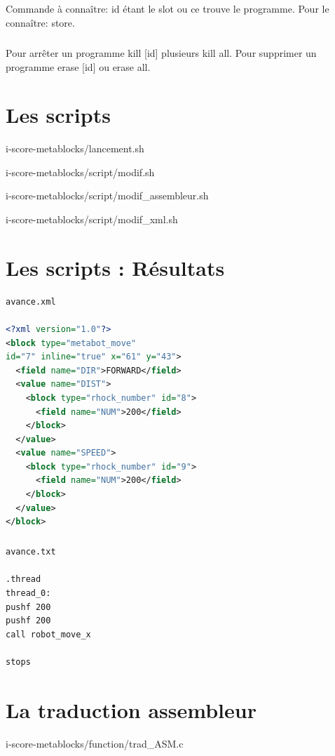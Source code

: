 \documentclass[10pt,a4paper]{report}
\begin{document}
\begin{appendices}
\paragraph{}
Commande à connaître:
id étant le slot ou ce trouve le programme. Pour le connaître: store.
\paragraph{}
Pour arrêter un programme kill [id] plusieurs kill all. Pour supprimer un programme erase [id] ou erase all.

\chapter{Les scripts} 

{i-score-metablocks/lancement.sh}


{i-score-metablocks/script/modif.sh}


{i-score-metablocks/script/modif_assembleur.sh}


{i-score-metablocks/script/modif_xml.sh}

\chapter{Les scripts : Résultats} 
\begin{lstlisting}[language=xml, frame=none]
avance.xml

<?xml version="1.0"?>
<block type="metabot_move" 
id="7" inline="true" x="61" y="43">
  <field name="DIR">FORWARD</field>
  <value name="DIST">
    <block type="rhock_number" id="8">
      <field name="NUM">200</field>
    </block>
  </value>
  <value name="SPEED">
    <block type="rhock_number" id="9">
      <field name="NUM">200</field>
    </block>
  </value>
</block>
\end{lstlisting}
\paragraph{}

\begin{verbatim}
avance.txt

.thread
thread_0:
pushf 200
pushf 200
call robot_move_x

stops 
\end{verbatim}
\chapter{La traduction assembleur} 

{i-score-metablocks/function/trad_ASM.c}


\end{appendices}
\end{document}
